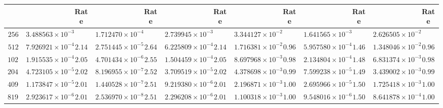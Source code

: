\documentclass{article}
\begin{document}
\begin{tabular}[]{|c||c|c|c|c|c|c||c|c|c|c|c|c|}
    &&Rate&&Rate&&Rate&&Rate&&Rate&&Rate \\
    \hline
    $256$&$3.488563\times{10}^{-3}$&&$1.712470\times{10}^{-4}$&&$2.739945\times{10}^{-3}$&
         &$3.344127\times{10}^{-2}$&&$1.641565\times{10}^{-3}$&&$2.626505\times{10}^{-2}$& \\
    \hline
    $512$&$7.926921\times{10}^{-4}$&$2.14$&$2.751445\times{10}^{-5}$&$2.64$&$6.225809\times{10}^{-4}$&$2.14$
         &$1.716381\times{10}^{-2}$&$0.96$&$5.957580\times{10}^{-4}$&$1.46$&$1.348046\times{10}^{-2}$&$0.96$ \\
    \hline
    $1024$&$1.915535\times{10}^{-4}$&$2.05$&$4.701434\times{10}^{-6}$&$2.55$&$1.504459\times{10}^{-4}$&$2.05$
          &$8.697968\times{10}^{-3}$&$0.98$&$2.134804\times{10}^{-4}$&$1.48$&$6.831374\times{10}^{-3}$&$0.98$ \\
    \hline
    $2048$&$4.723105\times{10}^{-5}$&$2.02$&$8.196955\times{10}^{-7}$&$2.52$&$3.709519\times{10}^{-5}$&$2.02$
          &$4.378698\times{10}^{-3}$&$0.99$&$7.599238\times{10}^{-5}$&$1.49$&$3.439002\times{10}^{-3}$&$0.99$ \\
    \hline
    $4098$&$1.173847\times{10}^{-5}$&$2.01$&$1.440528\times{10}^{-7}$&$2.51$&$9.219380\times{10}^{-6}$&$2.01$
          &$2.196871\times{10}^{-3}$&$1.00$&$2.695966\times{10}^{-5}$&$1.50$&$1.725418\times{10}^{-3}$&$1.00$ \\
    \hline
    $8192$&$2.923617\times{10}^{-6}$&$2.01$&$2.536970\times{10}^{-8}$&$2.51$&$2.296208\times{10}^{-6}$&$2.01$
          &$1.100318\times{10}^{-3}$&$1.00$&$9.548016\times{10}^{-6}$&$1.50$&$8.641878\times{10}^{-4}$&$1.00$ \\
    \hline
  \end{tabular}      
\end{document}
